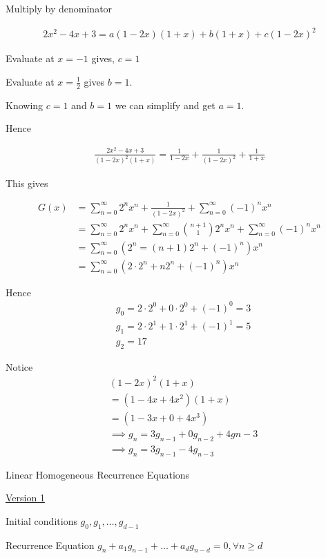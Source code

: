 \documentclass{article}
\begin{document}
Multiply by denominator

\begin{align*}
    2x^2 - 4x + 3 = a(1-2x)(1+x) + b(1+x) + c(1-2x)^2
\end{align*}

Evaluate at $x=-1$ gives, $c=1$

Evaluate at $x= \frac{1}{2}$ gives $b = 1$.

Knowing $c=1$ and $b=1$ we can simplify and get $a=1$.

Hence

\begin{align*}
    \frac{2x^2-4x+3}{(1-2x)^2(1+x)} = \frac{1}{1-2x} + \frac{1}{(1-2x)^2} + \frac{1}{1+x}
\end{align*}

This gives

\begin{align*}
    G(x) &= \sum_{n=0}^{\infty}2^nx^n + \frac{1}{(1-2x)^2} + \sum_{n=0}^{\infty}(-1)^nx^n \\
    &= \sum_{n=0}^{\infty}2^nx^n + \sum_{n=0}^{\infty}\binom{n+1}{1}2^nx^n + \sum_{n=0}^{\infty}(-1)^nx^n \\
    &= \sum_{n=0}^{\infty}(2^n = (n+1)2^n + (-1)^n)x^n \\
    &= \sum_{n=0}^{\infty}(2 \cdot 2^n + n2^n + (-1)^n)x^n
\end{align*}

Hence 
\begin{align*}
    &g_0 = 2 \cdot 2^0 + 0 \cdot 2^0 + (-1)^0 = 3 \\ 
    &g_1 = 2 \cdot 2^1 + 1 \cdot 2^1 + (-1)^1 = 5 \\
    &g_2 = 17
\end{align*}

Notice
\begin{align*}
    &(1-2x)^2(1+x) \\
    &= (1-4x+4x^2)(1+x) \\
    &= (1-3x + 0 + 4x^3) \\
    &\implies g_n = 3g_{n-1} + 0 g_{n-2} + 4g{n-3} \\
    &\implies g_n = 3g_{n-1} - 4g_{n-3}
\end{align*}

Linear Homogeneous Recurrence Equations

\underline{Version 1}

Initial conditions $g_0, g_1, \ldots, g_{d-1}$

Recurrence Equation $g_n + a_1g_{n-1}+\ldots+a_dg_{n-d}=0, \forall n \ge d$
\end{document}
